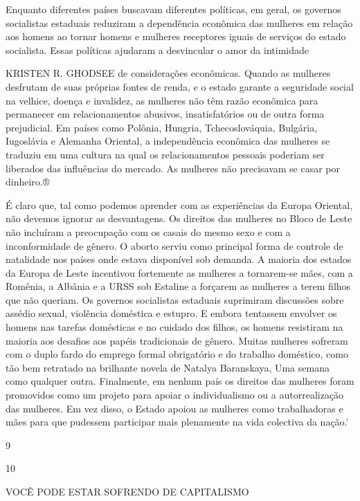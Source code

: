  \par 
Enquanto diferentes países buscavam diferentes políticas, em geral, os governos socialistas estaduais reduziram a dependência econômica das mulheres em relação aos homens ao tornar homens e mulheres receptores iguais de serviços do estado socialista. Essas políticas ajudaram a desvincular o amor da intimidade
 \par 
KRISTEN R. GHODSEE de considerações econômicas. Quando as mulheres desfrutam de suas próprias fontes de renda, e o estado garante a seguridade social na velhice, doença e invalidez, as mulheres não têm razão econômica para permanecer em relacionamentos abusivos, insatisfatórios ou de outra forma prejudicial. Em países como Polônia, Hungria, Tchecoslováquia, Bulgária, Iugoslávia e Alemanha Oriental, a independência econômica das mulheres se traduziu em uma cultura na qual os relacionamentos pessoais poderiam ser liberados das influências do mercado. As mulheres não precisavam se casar por dinheiro.®
 \par 
É claro que, tal como podemos aprender com as experiências da Europa Oriental, não devemos ignorar as desvantagens. Os direitos das mulheres no Bloco de Leste não incluíram a preocupação com os casais do mesmo sexo e com a inconformidade de gênero. O aborto serviu como principal forma de controle de natalidade nos países onde estava disponível sob demanda. A maioria dos estados da Europa de Leste incentivou fortemente as mulheres a tornarem-se mães, com a Romênia, a Albânia e a URSS sob Estaline a forçarem as mulheres a terem filhos que não queriam. Os governos socialistas estaduais suprimiram discussões sobre assédio sexual, violência doméstica e estupro. E embora tentassem envolver os homens nas tarefas domésticas e no cuidado dos filhos, os homens resistiram na maioria aos desafios aos papéis tradicionais de gênero. Muitas mulheres sofreram com o duplo fardo do emprego formal obrigatório e do trabalho doméstico, como tão bem retratado na brilhante novela de Natalya Baranskaya, Uma semana como qualquer outra. Finalmente, em nenhum país os direitos das mulheres foram promovidos como um projeto para apoiar o individualismo ou a autorrealização das mulheres. Em vez disso, o Estado apoiou as mulheres como trabalhadoras e mães para que pudessem participar mais plenamente na vida colectiva da nação.’
 \par 
9
 \par 
10
 \par 
VOCÊ PODE ESTAR SOFRENDO DE CAPITALISMO
 \par 
